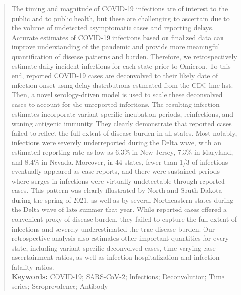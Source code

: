 \documentclass{article}
\begin{document}
\newpage
\suppressfloats
\begin{abstract}

The timing and magnitude of COVID-19 infections are of interest to the public
and to public health, but these are challenging to ascertain due to the volume
of undetected asymptomatic cases and reporting delays. Accurate estimates of
COVID-19 infections based on finalized data can improve understanding of the
pandemic and provide more meaningful quantification of disease patterns and
burden. Therefore, we retrospectively estimate daily incident infections for
each \US state prior to Omicron. To this end, reported COVID-19 cases are
deconvolved to their likely date of infection onset using delay distributions
estimated from the CDC line list. Then, a novel serology-driven model is used to
scale these deconvolved cases to account for the unreported infections. The
resulting infection estimates incorporate variant-specific incubation periods,
reinfections, and waning antigenic immunity. They clearly demonstrate that
reported cases failed to reflect the full extent of disease burden in all
states. Most notably, infections were severely underreported during the Delta
wave, with an estimated reporting rate as low as 6.3\% in New Jersey, 7.3\% in
Maryland, and 8.4\% in Nevada. Moreover, in 44 states, fewer than 1/3 of
infections eventually appeared as case reports, and there were sustained periods
where surges in infections were virtually undetectable through reported cases.
This pattern was clearly illustrated by North and South Dakota during the spring
of 2021, as well as by several Northeastern states during the Delta wave of late
summer that year. While reported cases offered a convenient proxy of
disease burden, they failed to capture the full extent of infections and
severely underestimated the true disease burden. Our retrospective analysis
also estimates other important quantities for every state, including
variant-specific deconvolved cases, time-varying case ascertainment ratios, as
well as infection-hospitalization and infection-fatality ratios. \\

\noindent\textbf{Keywords:} COVID-19; SARS-CoV-2; Infections; Deconvolution; Time series; Seroprevalence; Antibody

\end{abstract}






\end{document}
